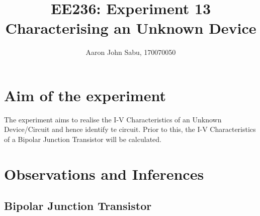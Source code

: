 \documentclass[12pt]{article}
\title{EE236: Experiment 13\\
Characterising an Unknown Device}
\author{Aaron John Sabu, 170070050}
\begin{document}
\maketitle

\section{Aim of the experiment}

The experiment aims to realise the I-V Characteristics of an Unknown Device/Circuit and hence identify te circuit. Prior to this, the I-V Characteristics of a Bipolar Junction Transistor will be calculated. 

\section{Observations and Inferences}

\subsection{Bipolar Junction Transistor}
\end{document}
